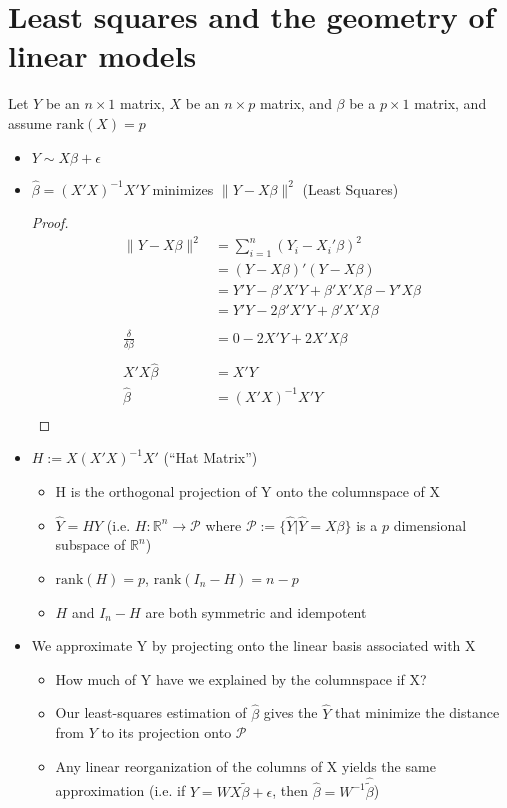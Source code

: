 \documentclass[12pt]{article}\usepackage{graphicx, color}
\theoremstyle{definition}
\newcommand{\rank}{\mathrm{rank}}
\renewcommand{\tilde}{\widetilde}
\renewcommand{\hat}{\widehat}
\renewcommand{\Re}{\mathbb{R}}
\begin{document}
\section{Least squares and the geometry of linear models}
Let $Y$ be an $n\times 1$ matrix, $X$ be an $n\times p$ matrix, and $\beta$ be a $p\times 1$ matrix, and assume $\rank(X)=p$
\begin{itemize}
\item $Y \sim X\beta + \epsilon$
\item $\hat \beta =(X'X)^{-1}X'Y$ minimizes $\|Y-X\beta\|^2$ (Least Squares)
\begin{proof}
\begin{align*}\|Y-X\beta\|^2&=\sum_{i=1}^n(Y_i-X_i'\beta)^2\\
&=(Y-X\beta)'(Y-X\beta)\\
&=Y'Y-\beta'X'Y+\beta'X' X \beta -Y'X \beta\\
&=Y'Y-2\beta'X'Y+\beta'X' X \beta\\\
\\
\frac{\delta}{\delta \beta}&=0-2X'Y +2X'X\beta\\
\\
X'X\hat{\beta}&=X'Y\\
\hat{\beta}&=(X'X)^{-1}X'Y\\
\end{align*}
\end{proof}
\item $H:=X(X'X)^{-1}X'$ (``Hat Matrix'')
\begin{itemize}
\item H is the orthogonal projection of Y onto the columnspace of X
\item $\hat Y =H Y$ (i.e. $H:\Re^n \rightarrow \mathcal{P}$ where $\mathcal{P}:=\{\hat Y| \hat Y =X \beta\}$ is a $p$ dimensional subspace of $\Re^n$)
\item $\rank(H)=p$, $\rank(I_n-H)=n-p$
\item $H$ and $I_n-H$ are both symmetric and idempotent
\end{itemize}
\item We approximate Y by projecting onto the linear basis associated with X
\begin{itemize}
\item How much of Y have we explained by the columnspace if X?
\item Our least-squares estimation of $\hat \beta$ gives the $\hat Y$ that minimize the distance from $Y$ to its projection onto $\mathcal{P}$
\item Any linear reorganization of the columns of X yields the same approximation (i.e. if $Y=WX\tilde \beta +\epsilon$, then $\hat  \beta = W^{-1}\hat{\tilde \beta}$)
\end{itemize}
\end{itemize} 
\end{document}
